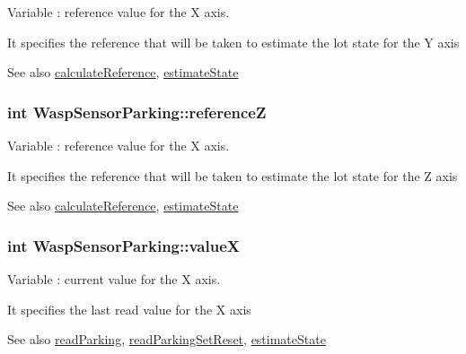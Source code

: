 Variable \+: reference value for the X axis. 

It specifies the reference that will be taken to estimate the lot state for the Y axis \begin{DoxySeeAlso}{See also}
\hyperlink{class_wasp_sensor_parking_a8fe1255a714fed88684a89363963eb02}{calculate\+Reference}, \hyperlink{class_wasp_sensor_parking_a5635382fc068370a3b561c94dccbb283}{estimate\+State} 
\end{DoxySeeAlso}
\subsubsection[{\texorpdfstring{referenceZ}{referenceZ}}]{\setlength{\rightskip}{0pt plus 5cm}int Wasp\+Sensor\+Parking\+::referenceZ}\hypertarget{class_wasp_sensor_parking_a4508196e8faaf3b2ad894fb2a277ebbd}{}\label{class_wasp_sensor_parking_a4508196e8faaf3b2ad894fb2a277ebbd}


Variable \+: reference value for the X axis. 

It specifies the reference that will be taken to estimate the lot state for the Z axis \begin{DoxySeeAlso}{See also}
\hyperlink{class_wasp_sensor_parking_a8fe1255a714fed88684a89363963eb02}{calculate\+Reference}, \hyperlink{class_wasp_sensor_parking_a5635382fc068370a3b561c94dccbb283}{estimate\+State} 
\end{DoxySeeAlso}
\subsubsection[{\texorpdfstring{valueX}{valueX}}]{\setlength{\rightskip}{0pt plus 5cm}int Wasp\+Sensor\+Parking\+::valueX}\hypertarget{class_wasp_sensor_parking_a6b1a1e36659642554802b51ffacead27}{}\label{class_wasp_sensor_parking_a6b1a1e36659642554802b51ffacead27}


Variable \+: current value for the X axis. 

It specifies the last read value for the X axis \begin{DoxySeeAlso}{See also}
\hyperlink{class_wasp_sensor_parking_a495a2b26ed6620d327b7cd902696f533}{read\+Parking}, \hyperlink{class_wasp_sensor_parking_a8a3311a8d14d5538f2b42cba5c2cc8e0}{read\+Parking\+Set\+Reset}, \hyperlink{class_wasp_sensor_parking_a5635382fc068370a3b561c94dccbb283}{estimate\+State} 
\end{DoxySeeAlso}
